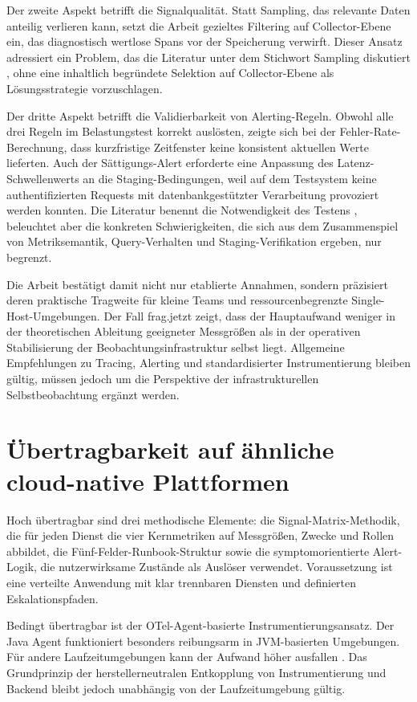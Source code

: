 Der zweite Aspekt betrifft die Signalqualität. Statt Sampling, das relevante Daten anteilig verlieren kann, setzt die Arbeit gezieltes Filtering auf Collector-Ebene ein, das diagnostisch wertlose Spans vor der Speicherung verwirft. Dieser Ansatz adressiert ein Problem, das die Literatur unter dem Stichwort Sampling diskutiert \parencite[S.~10]{albuquerque2025tracing}, ohne eine inhaltlich begründete Selektion auf Collector-Ebene als Lösungsstrategie vorzuschlagen.
 
Der dritte Aspekt betrifft die Validierbarkeit von Alerting-Regeln. Obwohl alle drei Regeln im Belastungstest korrekt auslösten, zeigte sich bei der Fehler-Rate-Berechnung, dass kurzfristige Zeitfenster keine konsistent aktuellen Werte lieferten. Auch der Sättigungs-Alert erforderte eine Anpassung des Latenz-Schwellenwerts an die Staging-Bedingungen, weil auf dem Testsystem keine authentifizierten Requests mit datenbankgestützter Verarbeitung provoziert werden konnten. Die Literatur benennt die Notwendigkeit des Testens \parencite[S.~175--176]{vinnakota2025creating}, beleuchtet aber die konkreten Schwierigkeiten, die sich aus dem Zusammenspiel von Metriksemantik, Query-Verhalten und Staging-Verifikation ergeben, nur begrenzt.
 
Die Arbeit bestätigt damit nicht nur etablierte Annahmen, sondern präzisiert deren praktische Tragweite für kleine Teams und ressourcenbegrenzte Single-Host-Umgebungen. Der Fall frag.jetzt zeigt, dass der Hauptaufwand weniger in der theoretischen Ableitung geeigneter Messgrößen als in der operativen Stabilisierung der Beobachtungsinfrastruktur selbst liegt. Allgemeine Empfehlungen zu Tracing, Alerting und standardisierter Instrumentierung bleiben gültig, müssen jedoch um die Perspektive der infrastrukturellen Selbstbeobachtung ergänzt werden.
 
 
\section{Übertragbarkeit auf ähnliche cloud-native Plattformen}
 
Hoch übertragbar sind drei methodische Elemente: die Signal-Matrix-Methodik, die für jeden Dienst die vier Kernmetriken auf Messgrößen, Zwecke und Rollen abbildet, die Fünf-Felder-Runbook-Struktur sowie die symptomorientierte Alert-Logik, die nutzerwirksame Zustände als Auslöser verwendet. Voraussetzung ist eine verteilte Anwendung mit klar trennbaren Diensten und definierten Eskalationspfaden.
 
Bedingt übertragbar ist der OTel-Agent-basierte Instrumentierungsansatz. Der Java Agent funktioniert besonders reibungsarm in JVM-basierten Umgebungen. Für andere Laufzeitumgebungen kann der Aufwand höher ausfallen \parencite[S.~52]{bissig2024unified}. Das Grundprinzip der herstellerneutralen Entkopplung von Instrumentierung und Backend bleibt jedoch unabhängig von der Laufzeitumgebung gültig.
 
